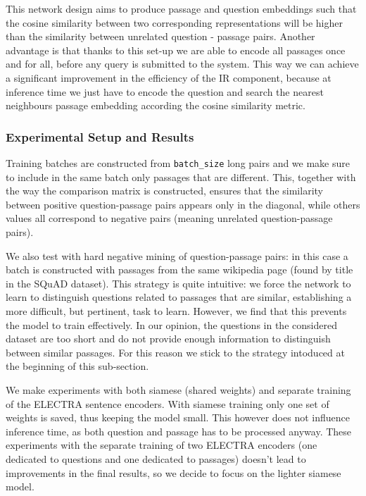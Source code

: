 \documentclass{article}
\newcommand{\code}[1]{\colorbox{light-gray}{\texttt{#1}}}
\begin{document}
This network design aims to produce passage and question embeddings such that the cosine similarity between two corresponding representations will be higher than the similarity between unrelated question - passage pairs.
Another advantage is that thanks to this set-up we are able to encode all passages once and for all, before any query is submitted to the system. This way we can achieve a significant improvement in the efficiency of the IR component, because at inference time we just have to encode the question and search the nearest neighbours passage embedding according the cosine similarity metric.

\subsubsection{Experimental Setup and Results}

Training batches are constructed from \code{batch\_size} long pairs and we make sure to include in the same batch only passages that are different. This, together with the way the comparison matrix is constructed, ensures that the similarity between positive question-passage pairs appears only in the diagonal, while others values all correspond to negative pairs (meaning unrelated question-passage pairs).

We also test with hard negative mining of question-passage pairs: in this case a batch is constructed with passages from the same wikipedia page (found by title in the SQuAD dataset).
This strategy is quite intuitive: we force the network to learn to distinguish questions related to passages that are similar, establishing a more difficult, but pertinent, task to learn. However, we find that this prevents the model to train effectively. In our opinion, the questions in the considered dataset are too short and do not provide enough information to distinguish between similar passages.
For this reason we stick to the strategy intoduced at the beginning of this sub-section.

We make experiments with both siamese (shared weights) and separate training of the ELECTRA sentence encoders. 
With siamese training only one set of weights is saved, thus keeping the model small.
This however does not influence inference time, as both question and passage has to be processed anyway. 
These experiments with the separate training of two ELECTRA encoders (one dedicated to questions and one dedicated to passages) doesn't lead to improvements in the final results, so we decide to focus on the lighter siamese model.  
\end{document}
